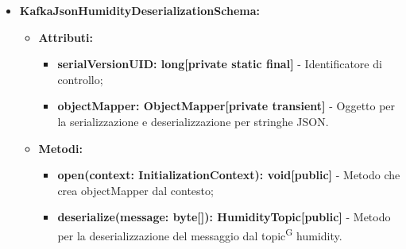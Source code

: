 \documentclass[8pt]{article}
\newcommand{\glossterm}[1]{#1\textsuperscript{G}} %
\begin{document}
\begin{itemize}
\begin{itemize}
\begin{itemize}
	\setlength\itemsep{0em}
            \item \textbf{serialVersionUID: long[private static final]} - Identificatore di controllo;
            \item \textbf{objectMapper: ObjectMapper[private transient]} - Oggetto per la serializzazione e deserializzazione per stringhe JSON.
        \end{itemize}
    \end{itemize}
    \begin{itemize}
	\setlength\itemsep{0em}
        \item \textbf{Metodi:}
        \begin{itemize}
	\setlength\itemsep{0em}
            \item \textbf{open(context: InitializationContext): void[public]} - Metodo che crea objectMapper dal contesto;
            \item \textbf{deserialize(message: byte[]): TemperatureTopic[public]} - Metodo per la deserializzazione del messaggio dal \glossterm{topic} temperature.
        \end{itemize}
    \end{itemize}
    \item \textbf{KafkaJsonHumidityDeserializationSchema:}
    \begin{itemize}
	\setlength\itemsep{0em}
        \item \textbf{Attributi:}
        \begin{itemize}
	\setlength\itemsep{0em}
            \item \textbf{serialVersionUID: long[private static final]} - Identificatore di controllo;
            \item \textbf{objectMapper: ObjectMapper[private transient]} - Oggetto per la serializzazione e deserializzazione per stringhe JSON.
        \end{itemize}
    \end{itemize}
    \begin{itemize}
	\setlength\itemsep{0em}
        \item \textbf{Metodi:}
        \begin{itemize}
	\setlength\itemsep{0em}
            \item \textbf{open(context: InitializationContext): void[public]} - Metodo che crea objectMapper dal contesto;
            \item \textbf{deserialize(message: byte[]): HumidityTopic[public]} - Metodo per la deserializzazione del messaggio dal \glossterm{topic} humidity.

\end{itemize}
\end{itemize}
\end{itemize}
\end{document}
